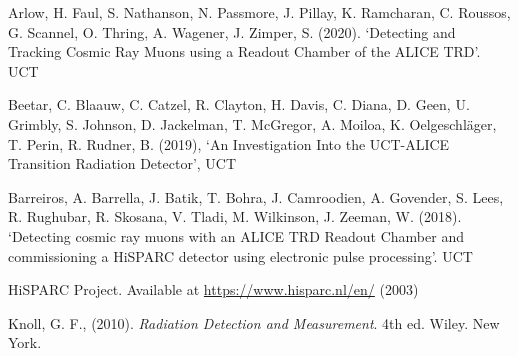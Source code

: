 \documentclass[11pt]{article}
\numberwithin{equation}{section}
\numberwithin{figure}{section}
\numberwithin{table}{section}
\begin{document}
\par 

\begin{thebibliography}{9}
     Arlow, H. Faul, S. Nathanson, N. Passmore, J. Pillay, K. Ramcharan, C. Roussos, G. Scannel, O. Thring, A. Wagener, J. Zimper, S. (2020). `Detecting and Tracking Cosmic Ray Muons using a Readout Chamber of the ALICE TRD'. UCT

     Beetar, C. Blaauw, C. Catzel, R. Clayton, H. Davis, C. Diana, D. Geen, U. Grimbly, S. Johnson, D. Jackelman, T. McGregor, A. Moiloa, K. Oelgeschl\"ager, T. Perin, R. Rudner, B. (2019), `An Investigation Into the UCT-ALICE Transition Radiation Detector', UCT
    
      Barreiros, A. Barrella, J. Batik, T. Bohra, J. Camroodien, A. Govender, S. Lees, R. Rughubar, R. Skosana, V. Tladi, M. Wilkinson, J. Zeeman, W. (2018). `Detecting cosmic ray muons with an ALICE TRD Readout Chamber and commissioning a HiSPARC detector using electronic pulse processing'. UCT

     HiSPARC Project. Available at \url{https://www.hisparc.nl/en/} (2003)

     Knoll, G. F., (2010). \textit{Radiation Detection and Measurement}. 4th ed. Wiley. New York.

    
\end{thebibliography}
\end{document}
